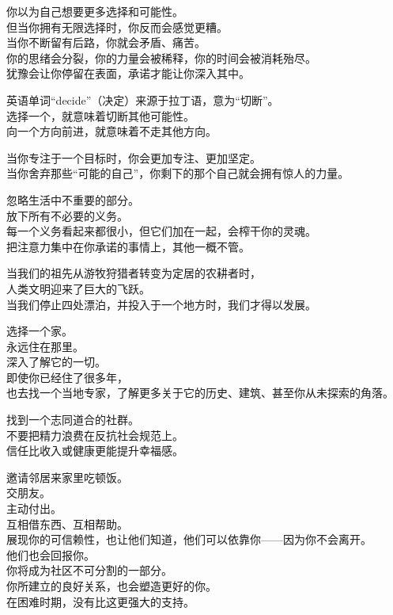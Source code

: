 \documentclass[
]{article}
\begin{document}
你以为自己想要更多选择和可能性。\\
但当你拥有无限选择时，你反而会感觉更糟。\\
当你不断留有后路，你就会矛盾、痛苦。\\
你的思绪会分裂，你的力量会被稀释，你的时间会被消耗殆尽。\\
犹豫会让你停留在表面，承诺才能让你深入其中。

英语单词``decide''（决定）来源于拉丁语，意为``切断''。\\
选择一个，就意味着切断其他可能性。\\
向一个方向前进，就意味着不走其他方向。

当你专注于一个目标时，你会更加专注、更加坚定。\\
当你舍弃那些``可能的自己''，你剩下的那个自己就会拥有惊人的力量。

忽略生活中不重要的部分。\\
放下所有不必要的义务。\\
每一个义务看起来都很小，但它们加在一起，会榨干你的灵魂。\\
把注意力集中在你承诺的事情上，其他一概不管。

当我们的祖先从游牧狩猎者转变为定居的农耕者时，\\
人类文明迎来了巨大的飞跃。\\
当我们停止四处漂泊，并投入于一个地方时，我们才得以发展。

选择一个家。\\
永远住在那里。\\
深入了解它的一切。\\
即使你已经住了很多年，\\
也去找一个当地专家，了解更多关于它的历史、建筑、甚至你从未探索的角落。

找到一个志同道合的社群。\\
不要把精力浪费在反抗社会规范上。\\
信任比收入或健康更能提升幸福感。

邀请邻居来家里吃顿饭。\\
交朋友。\\
主动付出。\\
互相借东西、互相帮助。\\
展现你的可信赖性，也让他们知道，他们可以依靠你------因为你不会离开。\\
他们也会回报你。\\
你将成为社区不可分割的一部分。\\
你所建立的良好关系，也会塑造更好的你。\\
在困难时期，没有比这更强大的支持。
\end{document}
